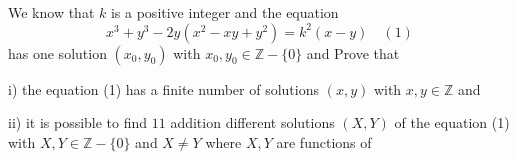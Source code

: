 We know that $k$ is a positive integer and the equation \[ x^3+y^3-2y(x^2-xy+y^2)=k^2(x-y) \quad (1) \] has one solution $(x_0,y_0)$ with
$x_0,y_0\in \mathbb{Z}-\{0\}$ and  Prove that

i) the equation (1) has a finite number of solutions $(x,y)$ with $x,y\in \mathbb{Z}$ and 

ii) it is possible to find $11$ addition different solutions $(X,Y)$ of the equation (1) with $X,Y\in \mathbb{Z}-\{0\}$ and $X\neq Y$ where $X,Y$ are  functions of 